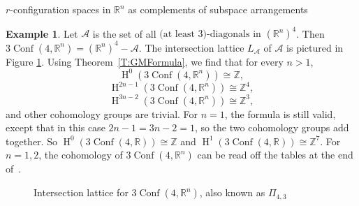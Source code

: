 \documentclass[12pt]{amsart}
\newcommand{\R}{{\mathbb R}}
\newcommand{\Z}{{\mathbb Z}}
\newcommand{\Ho}{\operatorname{H}}
\newcommand{\Conf}{\operatorname{Conf}}
\newcommand{\calA}{{\mathcal{A}}}
\theoremstyle{plain}
\theoremstyle{definition}
\newtheorem{example}[thm]{Example}
\theoremstyle{remark}
\begin{document}
\begin{section}{$r$-configuration spaces in $\mathbb R^n$ as complements of subspace arrangements}
\begin{example} Let $\calA$ is the set of all $\text{(at least } 3) \text{-diagonals in } (\R^n)^4$. Then $3\Conf(4,\R^n)=(\R^n)^4-\calA$. The intersection lattice $L_{\calA}$ of $\calA$ is pictured in Figure \ref{fig:3Conf4}. %
Using Theorem~\ref{T:GMFormula}, we find that for every $n> 1$, $$\Ho^{0}(3\Conf(4,\R^n))\cong \Z,$$ $$\Ho^{2n-1}(3\Conf(4,\R^n))\cong \Z^4,$$ $$\Ho^{3n-2}(3\Conf(4,\R^n))\cong \Z^3,$$ and other cohomology groups are trivial.
For $n=1$, the formula is still valid, except that in this case $2n-1=3n-2=1$, so the two cohomology groups add together. So $\Ho^{0}(3\Conf(4,\R))\cong \Z$ and $\Ho^{1}(3\Conf(4,\R))\cong \Z^7.$ For $n=1, 2$, the cohomology of $3\Conf(4,\R^n)$ can be read off the tables at the end of~\cite{Bjo95}.

\end{example}

\begin{figure}
\begin{center}
\end{center}
\caption{Intersection lattice for $3\Conf(4,\R^n)$, also known as $\Pi_{4,3}$}
\label{fig:3Conf4}
\end{figure}


\end{section}
\end{document}
